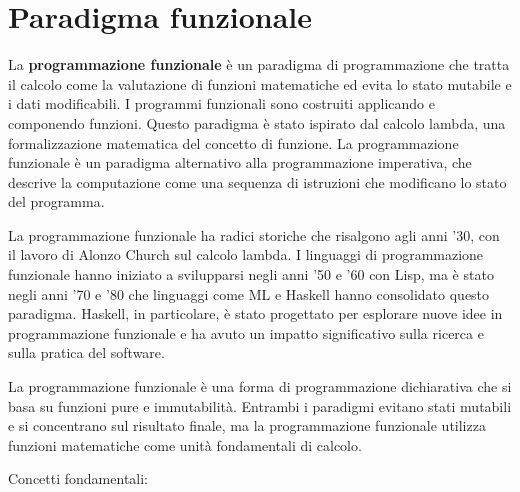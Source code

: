 \documentclass[
  letterpaper,
]{scrbook}
\begin{document}
\section{Paradigma funzionale}\label{paradigma-funzionale}

La \textbf{programmazione funzionale} è un paradigma di programmazione
che tratta il calcolo come la valutazione di funzioni matematiche ed
evita lo stato mutabile e i dati modificabili. I programmi funzionali
sono costruiti applicando e componendo funzioni. Questo paradigma è
stato ispirato dal calcolo lambda, una formalizzazione matematica del
concetto di funzione. La programmazione funzionale è un paradigma
alternativo alla programmazione imperativa, che descrive la computazione
come una sequenza di istruzioni che modificano lo stato del programma.

La programmazione funzionale ha radici storiche che risalgono agli anni
'30, con il lavoro di Alonzo Church sul calcolo lambda. I linguaggi di
programmazione funzionale hanno iniziato a svilupparsi negli anni '50 e
'60 con Lisp, ma è stato negli anni '70 e '80 che linguaggi come ML e
Haskell hanno consolidato questo paradigma. Haskell, in particolare, è
stato progettato per esplorare nuove idee in programmazione funzionale e
ha avuto un impatto significativo sulla ricerca e sulla pratica del
software.

La programmazione funzionale è una forma di programmazione dichiarativa
che si basa su funzioni pure e immutabilità. Entrambi i paradigmi
evitano stati mutabili e si concentrano sul risultato finale, ma la
programmazione funzionale utilizza funzioni matematiche come unità
fondamentali di calcolo.

Concetti fondamentali:
\end{document}
